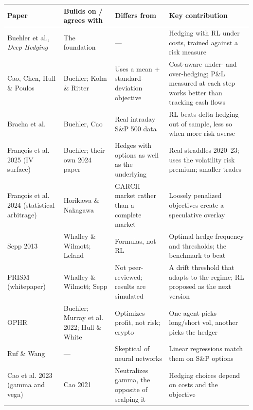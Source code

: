 \documentclass{article}
\begin{document}
\begin{center}\small
\begin{tabularx}{\linewidth}{>{\raggedright\arraybackslash}X >{\raggedright\arraybackslash}X >{\raggedright\arraybackslash}X >{\raggedright\arraybackslash}X}
\toprule
\textbf{Paper} & \textbf{Builds on /\allowbreak{} agrees with} & \textbf{Differs from} & \textbf{Key contribution} \\
\midrule
Buehler et al., \emph{Deep Hedging} & The foundation & --- & Hedging with RL under costs, trained against a risk measure \\
Cao, Chen, Hull \& Poulos & Buehler; Kolm \& Ritter & Uses a mean + standard-deviation objective & Cost-aware under- and over-hedging; P\&L measured at each step works better than tracking cash flows \\
Bracha et al. & Buehler, Cao & Real intraday S\&P 500 data & RL beats delta hedging out of sample, less so when more risk-averse \\
François et al. 2025 (IV surface) & Buehler; their own 2024 paper & Hedges with options as well as the underlying & Real straddles 2020--23; uses the volatility risk premium; smaller trades \\
François et al. 2024 (statistical arbitrage) & Horikawa \& Nakagawa & GARCH market rather than a complete market & Loosely penalized objectives create a speculative overlay \\
Sepp 2013 & Whalley \& Wilmott; Leland & Formulas, not RL & Optimal hedge frequency and thresholds; the benchmark to beat \\
PRISM (whitepaper) & Whalley \& Wilmott; Sepp & Not peer-reviewed; results are simulated & A drift threshold that adapts to the regime; RL proposed as the next version \\
OPHR & Buehler; Murray et al. 2022; Hull \& White & Optimizes profit, not risk; crypto & One agent picks long/\allowbreak{}short vol, another picks the hedger \\
Ruf \& Wang & --- & Skeptical of neural networks & Linear regressions match them on S\&P options \\
Cao et al. 2023 (gamma and vega) & Cao 2021 & Neutralizes gamma, the opposite of scalping it & Hedging choices depend on costs and the objective \\
\bottomrule
\end{tabularx}
\end{center}
\end{document}
